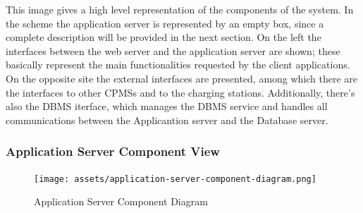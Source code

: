 \documentclass[table, 12pt]{article}
\begin{document}
This image gives a high level representation of the components of the system.
In the scheme the application server is represented by an empty box, since a complete description will be provided in the next section. On the left the interfaces between the web server and the application server are shown; these basically represent the main functionalities requested by the client applications. On the opposite site the external interfaces are presented, among which there are the interfaces to other CPMSs and to the charging stations. Additionally, there's also the DBMS iterface, which manages the DBMS service and handles all communications between the Applicantion server and the Database server. 

\subsubsection*{Application Server Component View}
\begin{center}
    \begin{figure}[H]
        \texttt{[image: assets/application-server-component-diagram.png]}
        \caption{Application Server Component Diagram}
        \label{fig: application_server_component_view}
    \end{figure}
\end{center}
\end{document}
